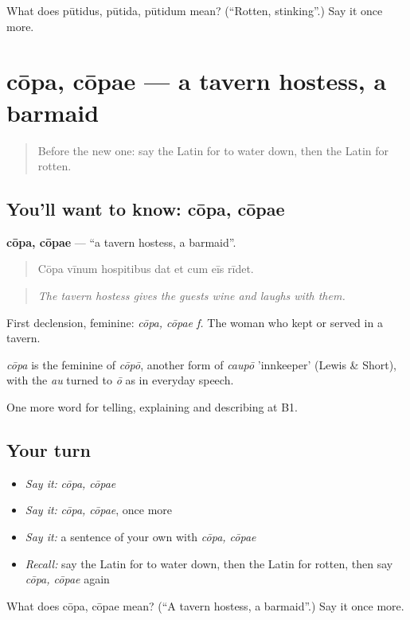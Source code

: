 \begin{tcolorbox}[breakable,colback=teal!4,colframe=teal!35!black,title={Before you move on}]
What does pūtidus, pūtida, pūtidum mean? (\textquotedblleft{}Rotten, stinking\textquotedblright{}.) Say it once more.
\end{tcolorbox}
\section[cōpa, cōpae]{cōpa, cōpae — a tavern hostess, a barmaid}

\label{lesson:LA-C449-copa}



\begin{quote}
Before the new one: say the Latin for to water down, then the Latin for rotten.
\end{quote}

\subsection*{You'll want to know: cōpa, cōpae}
\textbf{cōpa, cōpae} — \textquotedblleft{}a tavern hostess, a barmaid\textquotedblright{}.

\begin{quote}
Cōpa vīnum hospitibus dat et cum eīs rīdet.
\end{quote}

\begin{quote}
\emph{The tavern hostess gives the guests wine and laughs with them.}
\end{quote}

First declension, feminine: \emph{cōpa, cōpae f.} The woman who kept or served in a tavern.

\begin{cousinweb}
\emph{cōpa} is the feminine of \emph{cōpō}, another form of \emph{caupō} 'innkeeper' (Lewis \& Short), with the \emph{au} turned to \emph{ō} as in everyday speech.
\end{cousinweb}

\begin{grammarlens}[title={What you've built}]
One more word for telling, explaining and describing at B1.
\end{grammarlens}

\subsection*{Your turn}
\begin{itemize}
\raggedright
  \item \emph{Say it:} \emph{cōpa, cōpae}
  \item \emph{Say it:} \emph{cōpa, cōpae}, once more
  \item \emph{Say it:} a sentence of your own with \emph{cōpa, cōpae}
  \item \emph{Recall:} say the Latin for to water down, then the Latin for rotten, then say \emph{cōpa, cōpae} again
\end{itemize}

\begin{tcolorbox}[breakable,colback=teal!4,colframe=teal!35!black,title={Before you move on}]
What does cōpa, cōpae mean? (\textquotedblleft{}A tavern hostess, a barmaid\textquotedblright{}.) Say it once more.
\end{tcolorbox}
